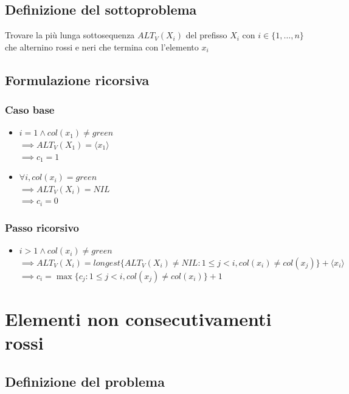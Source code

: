 \subsection{Definizione del sottoproblema}
Trovare la più lunga sottosequenza $ALT_V(X_i)$ del prefisso $X_i$ con $i \in \{1,\dots,n\}$ che alternino rossi e neri che termina con l'elemento $x_i$

\subsection{Formulazione ricorsiva}

\subsubsection{Caso base}
\begin{itemize}
    \item $i=1 \land col(x_1) \not = green$ \\
    $\implies ALT_V(X_1) = \langle x_1 \rangle$ \\
    $\implies c_1 = 1$

    \item $\forall i, col(x_i) = green$ \\
    $\implies ALT_V(X_i) = NIL$ \\
    $\implies c_i = 0$
\end{itemize}

\subsubsection{Passo ricorsivo}
\begin{itemize}
    \item $i>1 \land col(x_i) \not = green$\\
    $\implies ALT_V(X_i) = longest\{ALT_V(X_i) \not = NIL : 1 \leq j < i, col(x_i) \not = col(x_j)\} + \langle x_i \rangle$ \\
    $\implies c_i = \max\{c_j : 1 \leq j < i, col(x_j) \not = col(x_i)\} +1$
\end{itemize}

\newpage
\section{Elementi non consecutivamenti rossi}

\subsection{Definizione del problema}

